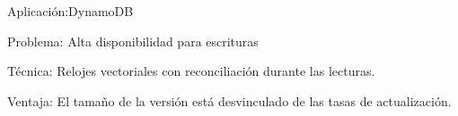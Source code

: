 \begin{frame}[fragile]{Aplicación:}{DynamoDB}
    \justifying

    Problema:
    Alta disponibilidad para escrituras

    Técnica:
    Relojes vectoriales con reconciliación durante las lecturas.

    Ventaja:
    El tamaño de la versión está desvinculado de las tasas de actualización.

\end{frame}
